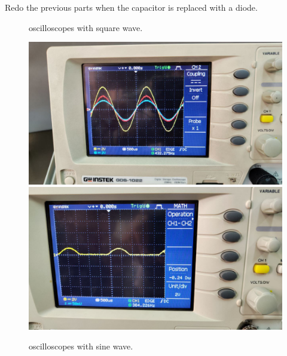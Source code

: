 \documentclass[11pt]{article}
\begin{document}
\begin{question}
\begin{subquestion}{Redo the previous parts when the capacitor is replaced with a diode.}
{\begin{figure}[H]
                \caption{oscilloscopes with square wave.}
            \end{figure}
            \begin{figure}[H]
                \centering
                \includegraphics[scale=0.1,angle=0]{Fig/23.jpeg}
                \includegraphics[scale=0.1,angle=0]{Fig/24.jpeg}
                \caption{oscilloscopes with sine wave.}
            \end{figure}
        }
    \end{subquestion}

\end{question}



\begin{question}


    \answer{}

\end{question}
\end{document}
